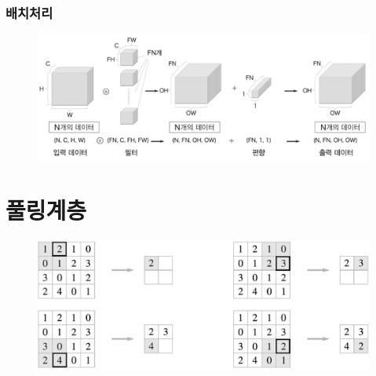\documentclass{beamer}
\begin{document}
\begin{frame}
	\frametitle{배치처리}
	\begin{figure}
		\includegraphics[width=1\columnwidth]{../Figure/Figure_9.pdf}
	\end{figure}
\end{frame}

\section{풀링계층}
\begin{frame}
	\begin{figure}
		\includegraphics[width=1\columnwidth]{../Figure/Figure_10.pdf}
	\end{figure}
\end{frame}
\end{document}
